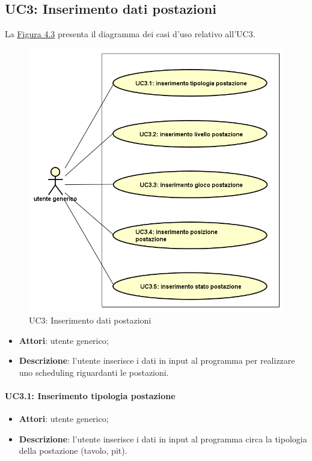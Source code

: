 \subsection{UC3: Inserimento dati postazioni}
\label{UC3}
La \hyperref[fig43]{Figura 4.3} presenta il diagramma dei casi d'uso relativo all'UC3.
\begin{figure}[!h]
    \label{fig43}
    \includegraphics[width=\textwidth]{../immagini/usecase/UC3.png}
    \caption{UC3: Inserimento dati postazioni}
\end{figure}
\FloatBarrier
\noindent
\begin{itemize}
    \item \textbf{Attori}: utente generico;
    \item \textbf{Descrizione}: l'utente inserisce i dati in input al programma per realizzare uno scheduling riguardanti le postazioni.
\end{itemize}
\paragraph{UC3.1: Inserimento tipologia postazione}
\begin{itemize}
    \item \textbf{Attori}: utente generico;
    \item \textbf{Descrizione}: l'utente inserisce i dati in input al programma circa la tipologia della postazione (tavolo, pit).
\end{itemize}
